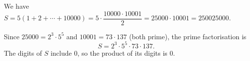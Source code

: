 We have $S=5(1+2+\cdots+10000)=5\cdot\dfrac{10000\cdot10001}{2}=25000\cdot10001=\boxed{250025000}$.

Since $25000=2^3\cdot5^5$ and $10001=73\cdot137$ (both prime), the prime factorisation is
\[
S=\boxed{2^3\cdot5^5\cdot73\cdot137}.
\]
The digits of $S$ include $0$, so the product of its digits is $\boxed{0}$.
